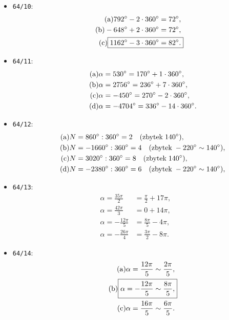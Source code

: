 \documentclass[a4paper, 11pt]{article}
\begin{document}
\begin{itemize}
		\item \texttt{64/10}:
			\begin{align}
				\tag{a}
				792\degree - 2 \cdot 360\degree = 72\degree,
			\\
				\tag{b}
				-648\degree + 2 \cdot 360\degree = 72\degree,
			\\
				\tag{c}
				\Aboxed{1162\degree - 3 \cdot 360\degree = 82\degree.}
			\end{align}
		
		\item \texttt{64/11}:
			\begin{align}
				\tag{a}
				\alpha &= 530\degree = 170\degree + 1 \cdot 360\degree,
			\\
				\tag{b}
				\alpha &= 2756\degree = 236\degree + 7 \cdot 360\degree,
			\\
				\tag{c}
				\alpha &= -450\degree = 270\degree - 2 \cdot 360\degree,
			\\
				\tag{d}
				\alpha &= -4704\degree = 336\degree - 14 \cdot 360\degree.
			\end{align}
		
		\item \texttt{64/12}:
			\begin{align}
				\tag{a}
				N &= 860\degree : 360\degree = 2 \quad (\mathrm{zbytek} \; 140\degree),
			\\
				\tag{b}
				N &= -1660\degree : 360\degree = 4 \quad (\mathrm{zbytek} \; -220\degree \sim 140\degree),
			\\
				\tag{c}
				N &= 3020\degree : 360\degree = 8 \quad (\mathrm{zbytek} \; 140\degree),
			\\
				\tag{d}
				N &= -2380\degree : 360\degree = 6 \quad (\mathrm{zbytek} \; -220\degree \sim 140\degree),
			\end{align}
		
		\item {\texttt{64/13}}:
			\begin{align}
				\tag{a}
				\alpha = \frac{35\pi}{2} &= \frac{\pi}{2} + 17\pi,
			\\
				\tag{b}
				\alpha = \frac{42\pi}{3} &= 0 + 14\pi,
			\\
				\tag{c}
				\alpha = -\frac{12\pi}{5} &= \frac{8\pi}{5} - 4\pi,
			\\
				\tag{d}
				\alpha = -\frac{26\pi}{4} &= \frac{3\pi}{2} - 8\pi.
			\end{align}
		
		\item {\texttt{64/14}}:
			\begin{align}
				\tag{a}
				\alpha = \frac{12\pi}{5} &\sim \frac{2\pi}{5},
			\\
				\tag{b}
				\Aboxed{\alpha = -\frac{12\pi}{5} &\sim \frac{8\pi}{5},}
			\\
				\tag{c}
				\alpha = \frac{16\pi}{5} &\sim \frac{6\pi}{5}.
			\end{align}
		

\end{itemize}
\end{document}
